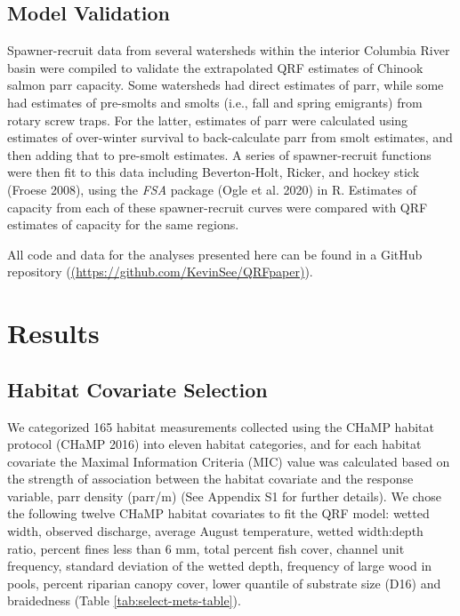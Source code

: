 \documentclass[
  12pt,
]{article}
\begin{document}
\hypertarget{model-validation}{%
\subsection{Model Validation}\label{model-validation}}

Spawner-recruit data from several watersheds within the interior Columbia River basin were compiled to validate the extrapolated QRF estimates of Chinook salmon parr capacity. Some watersheds had direct estimates of parr, while some had estimates of pre-smolts and smolts (i.e., fall and spring emigrants) from rotary screw traps. For the latter, estimates of parr were calculated using estimates of over-winter survival to back-calculate parr from smolt estimates, and then adding that to pre-smolt estimates. A series of spawner-recruit functions were then fit to this data including Beverton-Holt, Ricker, and hockey stick (Froese 2008), using the \emph{FSA} package (Ogle et al. 2020) in R. Estimates of capacity from each of these spawner-recruit curves were compared with QRF estimates of capacity for the same regions.

All code and data for the analyses presented here can be found in a GitHub repository (\href{https://github.com/KevinSee/QRFpaper}{(https://github.com/KevinSee/QRFpaper)}).

\hypertarget{results}{%
\section{Results}\label{results}}

\hypertarget{habitat-covariate-selection-1}{%
\subsection{Habitat Covariate Selection}\label{habitat-covariate-selection-1}}

We categorized 165 habitat measurements collected using the CHaMP habitat protocol (CHaMP 2016) into eleven habitat categories, and for each habitat covariate the Maximal Information Criteria (MIC) value was calculated based on the strength of association between the habitat covariate and the response variable, parr density (parr/m) (See Appendix S1 for further details). We chose the following twelve CHaMP habitat covariates to fit the QRF model: wetted width, observed discharge, average August temperature, wetted width:depth ratio, percent fines less than 6 mm, total percent fish cover, channel unit frequency, standard deviation of the wetted depth, frequency of large wood in pools, percent riparian canopy cover, lower quantile of substrate size (D16) and braidedness (Table \ref{tab:select-mets-table}).
\end{document}

